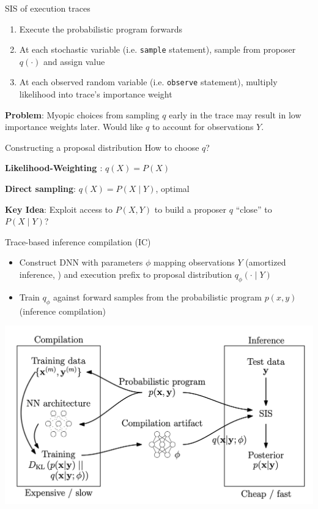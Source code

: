 \documentclass[12pt]{beamer}
\begin{document}
\begin{frame}{SIS of execution traces}
    \begin{enumerate}
        \item Execute the probabilistic program forwards
        \item At each stochastic variable (i.e. \texttt{sample} statement),
            sample from proposer $q(\cdot)$ and assign value
        \item At each observed random variable (i.e. \texttt{observe} statement),
            multiply likelihood into trace's importance weight
    \end{enumerate}
    \pause

    \textbf{Problem}: Myopic choices from sampling $q$ early in the trace
    may result in low importance weights later. Would like $q$ to account
    for observations $Y$.
\end{frame}

\begin{frame}[fragile]{Constructing a proposal distribution}
    How to choose $q$? 
    
    \pause
    \textbf{Likelihood-Weighting \cite{norvig2002modern}}: $q(X) = P(X)$

    \pause
    \textbf{Direct sampling}: $q(X) = P(X \mid Y)$, optimal
    
    \pause
    \textbf{Key Idea}: Exploit access to $P(X,Y)$ to
    build a proposer $q$ ``close'' to $P(X \mid Y)$?
\end{frame}

\begin{frame}{Trace-based inference compilation (IC)}
    \begin{itemize}
        \item Construct DNN with parameters $\phi$
        mapping observations $Y$ (amortized inference, \cite{goodman2013principles})
        and execution prefix to proposal distribution $q_\phi(\cdot \mid Y)$ 
        \item Train $q_\phi$ against forward samples from the probabilistic program
            $p(x,y)$ (inference compilation)
    \end{itemize}

    \centering
    \includegraphics[width=0.6\linewidth]{figures/ic.png}
\end{frame}
\end{document}
